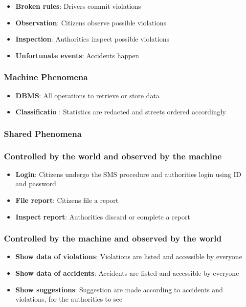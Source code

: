 \begin{itemize}
    \item \textbf{Broken rules}: Drivers commit violations
    \item \textbf{Observation}: Citizens observe possible violations
    \item \textbf{Inspection}: Authorities inspect possible violations 
    \item \textbf{Unfortunate events}: Accidents happen
\end{itemize}

\subsubsection{Machine Phenomena}

\begin{itemize}
    \item \textbf{DBMS}: All operations to retrieve or store data
    \item \textbf{Classificatio }: Statistics are redacted and 
    streets ordered accordingly
\end{itemize}

\subsubsection{Shared Phenomena}

\subsubsection*{Controlled by the world and observed by the machine}

\begin{itemize}
    \item \textbf{Login}: Citizens undergo the SMS procedure and authorities 
    login using ID and password
    \item \textbf{File report}: Citizens file a report
    \item \textbf{Inspect report}: Authorities discard or complete a report
\end{itemize}

\subsubsection*{Controlled by the machine and observed by the world}

\begin{itemize}
    \item \textbf{Show data of violations}: Violations are listed and 
    accessible by everyone
    \item \textbf{Show data of accidents}: Accidents are listed and accessible 
    by everyone
    \item \textbf{Show suggestions}: Suggestion are made according to accidents 
    and violations, for the authorities to see
\end{itemize}

